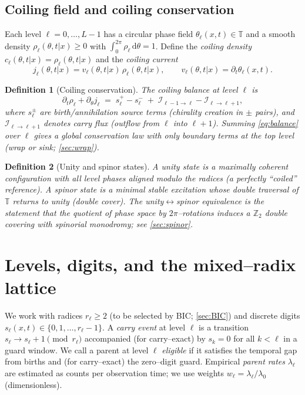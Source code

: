 \documentclass[11pt]{article}
\newtheorem{definition}{Definition}
\newcommand{\T}{\mathbb{T}} %
\newcommand{\ud}{\mathrm{d}}
\begin{document}
\subsection{Coiling field and coiling conservation}
Each level $\ell=0,\dots,L-1$ has a circular phase field $\theta_\ell(x,t)\in\T$ and a smooth density $\rho_\ell(\theta,t|x)\ge 0$ with $\int_{0}^{2\pi}\rho_\ell\,\ud\theta=1$.
Define the \emph{coiling density} $c_\ell(\theta,t|x)=\rho_\ell(\theta,t|x)$ and the \emph{coiling current}
\begin{equation}
  j_\ell(\theta,t|x)= v_\ell(\theta,t|x)\,\rho_\ell(\theta,t|x),\qquad v_\ell(\theta,t|x)=\partial_t \theta_\ell(x,t).
\end{equation}
\begin{definition}[Coiling conservation]
The \emph{coiling balance} at level $\ell$ is
\begin{equation}
  \partial_t \rho_\ell + \partial_\theta j_\ell \;=\; s_\ell^+ - s_\ell^- \;+\; \mathcal{I}_{\ell-1\to \ell} - \mathcal{I}_{\ell\to \ell+1},
  \label{eq:balance}
\end{equation}
where $s^\pm_\ell$ are birth/annihilation source terms (chirality creation in $\pm$ pairs), and $\mathcal{I}_{\ell\to\ell+1}$ denotes \emph{carry flux} (outflow from $\ell$ into $\ell+1$). Summing \eqref{eq:balance} over $\ell$ gives a global conservation law with only boundary terms at the top level (wrap or sink; \cref{sec:wrap}).
\end{definition}

\begin{definition}[Unity and spinor states]
A \emph{unity} state is a maximally coherent configuration with all level phases aligned modulo the radices (a perfectly ``coiled'' reference). A \emph{spinor} state is a minimal stable excitation whose double traversal of $\T$ returns to unity (double cover). The unity$\leftrightarrow$spinor equivalence is the statement that the quotient of phase space by $2\pi$--rotations induces a $\mathbb{Z}_2$ double covering with spinorial monodromy; see \cref{sec:spinor}.
\end{definition}

\section{Levels, digits, and the mixed--radix lattice}
We work with radices $r_\ell\ge 2$ (to be selected by BIC; \cref{sec:BIC}) and discrete digits $s_\ell(x,t)\in\{0,1,\dots,r_\ell-1\}$.
A \emph{carry event} at level $\ell$ is a transition $s_\ell\to s_\ell+1 \pmod{r_\ell}$ accompanied (for carry--exact) by $s_k=0$ for all $k<\ell$ in a guard window. We call a parent at level $\ell$ \emph{eligible} if it satisfies the temporal gap from births and (for carry--exact) the zero--digit guard.
Empirical \emph{parent rates} $\lambda_\ell$ are estimated as counts per observation time; we use weights $w_\ell=\lambda_\ell/\lambda_0$ (dimensionless).
\end{document}
